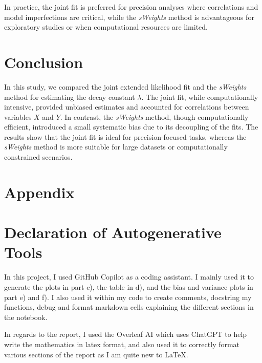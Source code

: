 \documentclass[11pt, a4paper]{article}
\begin{document}
In practice, the joint fit is preferred for precision analyses where correlations and model imperfections are critical, while the \textit{sWeights} method is advantageous for exploratory studies or when computational resources are limited.
\section{Conclusion}

In this study, we compared the joint extended likelihood fit and the \textit{sWeights} method for estimating the decay constant \(\lambda\). The joint fit, while computationally intensive, provided unbiased estimates and accounted for correlations between variables \(X\) and \(Y\). In contrast, the \textit{sWeights} method, though computationally efficient, introduced a small systematic bias due to its decoupling of the fits. The results show that the joint fit is ideal for precision-focused tasks, whereas the \textit{sWeights} method is more suitable for large datasets or computationally constrained scenarios.


\newpage




\appendix
\section*{Appendix}

\section{Declaration of Autogenerative Tools}

In this project, I used GitHub Copilot as a coding assistant. I mainly used it to generate the plots in part c), the table in d), and the bias and variance plots in part e) and f). I also used it within my code to create comments, docstring my functions, debug and format markdown cells explaining the different sections in the notebook.

In regards to the report, I used the Overleaf AI which uses ChatGPT to help write the mathematics in latex format, and also used it to correctly format various sections of the report as I am quite new to LaTeX.
\end{document}
